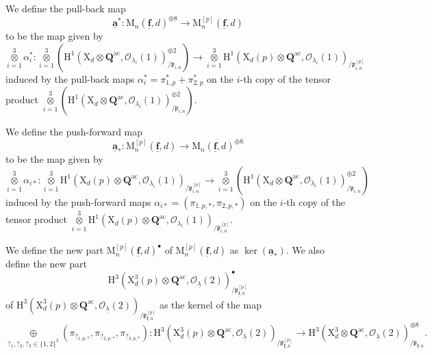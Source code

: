 \documentclass[10pt]{amsart}
\numberwithin{equation}{section}
\theoremstyle{plain}
\numberwithin{equation}{section}
\theoremstyle{definition}
\theoremstyle{remark}
\def\ac{\mathrm{ac}}
\def\ac{\mathrm{ac}}
\def\undlamb{\underline{\lambda}}
\def\triplef{\underline{\mathbf{f}}}
\def\threetensor{\overset{3}{\underset{i=1}\otimes}}
\def\calO{\mathcal{O}}
\def\frakp{\mathfrak{p}}
\def\QQ{\mathbf{Q}}
\def\rmH{\mathrm{H}}
\def\rmM{\mathrm{M}}
\def\rmX{\mathrm{X}}
\begin{document}
We define the pull-back map
\begin{equation*}
\underline{\mathbf{a}}^{\ast}: \rmM_{n}(\triplef, d)^{\oplus 8}\rightarrow \rmM^{[p]}_{n}(\triplef, d)
\end{equation*}
to be the map given by
\begin{equation*}
\threetensor\alpha^{\ast}_{i}:\threetensor(\rmH^{1}(\rmX_{d}\otimes \QQ^{\ac}, \calO_{\lambda_{i}}(1))^{\oplus 2}_{/\frakp_{i,n}})\rightarrow \threetensor\rmH^{1}(\rmX_{d}(p)\otimes \QQ^{\ac}, \calO_{\lambda_{i}}(1))_{/\frakp^{[p]}_{i, n}}
\end{equation*}
induced by the pull-back maps $\alpha^{\ast}_{i}=\pi^{\ast}_{1,p}+\pi^{\ast}_{2,p}$ on the $i$-th copy of the tensor product $\threetensor(\rmH^{1}(\rmX_{d}\otimes \QQ^{\ac}, \calO_{\lambda_{i}}(1))^{\oplus 2}_{/\frakp_{i,n}})$.  

We define the push-forward map
\begin{equation*}
\underline{\mathbf{a}}_{\ast}:\rmM^{[p]}_{n}(\triplef, d)\rightarrow \rmM_{n}(\triplef, d)^{\oplus 8}
\end{equation*}
to be the map given by
\begin{equation*}
\threetensor\alpha_{i\ast}:\threetensor\rmH^{1}(\rmX_{d}(p)\otimes \QQ^{\ac}, \calO_{\lambda_{i}}(1))_{/\frakp^{[p]}_{i, n}}\rightarrow \threetensor(\rmH^{1}(\rmX_{d}\otimes \QQ^{\ac}, \calO_{\lambda_{i}}(1))^{\oplus 2}_{/\frakp_{i,n}})
\end{equation*}
induced by the push-forward maps $\alpha_{i\ast}=(\pi_{1,p,\ast}, \pi_{2,p,\ast})$ on the $i$-th copy of the tensor product $\threetensor\rmH^{1}(\rmX_{d}(p)\otimes \QQ^{\ac}, \calO_{\lambda_{i}}(1))_{/\frakp^{[p]}_{i, n}}$.  

We define the new part 
$\rmM^{[p]}_{n}(\triplef, d)^{\bullet}$ of $\rmM^{[p]}_{n}(\triplef, d)$ as $\ker(\underline{\mathbf{a}}_{\ast})$. We also define the new part 
\begin{equation*}
\rmH^{3}(\rmX^{3}_{d}(p)\otimes\QQ^{\ac}, \calO_{\undlamb}(2))^{\bullet}_{/\frakp^{[p]}_{\triplef,n}}
\end{equation*}
of $\rmH^{3}(\rmX^{3}_{d}(p)\otimes\QQ^{\ac},  \calO_{\undlamb}(2))_{/\frakp^{[p]}_{\triplef,n}}$ as the kernel of the map
\begin{equation*}
\underset{?_{1}, ?_{2}, ?_{3}\in\{1, 2\}^{3}}\oplus(\pi_{?_{1, p, \ast}}, \pi_{?_{2,p,\ast}}, \pi_{?_{3,p, \ast}}): \rmH^{3}(\rmX^{3}_{d}(p)\otimes\QQ^{\ac}, \calO_{\undlamb}(2))_{/\frakp^{[p]}_{\triplef,n}}\rightarrow \rmH^{3}(\rmX^{3}_{d}\otimes\QQ^{\ac}, \calO_{\undlamb}(2))^{\oplus 8}_{/\frakp_{\triplef,n}}.
\end{equation*}
\end{document}
